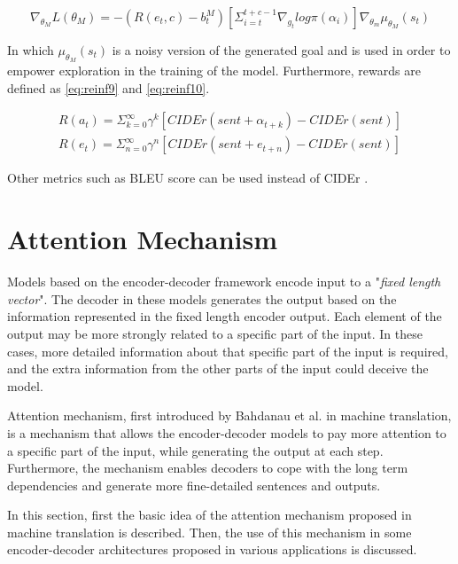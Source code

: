 \documentclass[preprint, 12pt]{elsarticle}
\begin{document}
		\begin{equation}
			\nabla_{\theta_M} L(\theta_M) = -(R(e_t, c) - b_t^M) [\Sigma_{i=t}^{t+c-1} \nabla_{g_t} log \pi(\alpha_i)] \nabla_{\theta_m} \mu_{\theta_M} (s_t)
			\label{eq:nabla}
		\end{equation}
		
		In which $\mu_{\theta_M} (s_t)$ is a noisy version of the generated goal and is used in order to empower exploration in the training of the model. Furthermore, rewards are defined as \eqref{eq:reinf9} and \eqref{eq:reinf10}.
		
		\begin{align}
			R(a_t) = \Sigma_{k=0}^\infty \gamma^k [CIDEr(sent + \alpha_{t+k}) - CIDEr(sent)] \label{eq:reinf9} \\
			R(e_t) = \Sigma_{n=0}^\infty \gamma^n [CIDEr(sent + e_{t+n}) - CIDEr(sent)] \label{eq:reinf10} 
		\end{align}
		
		Other metrics such as BLEU score can be used instead of CIDEr \cite{papineni2002bleu}.
		
	\section{Attention Mechanism}
		Models based on the encoder-decoder framework encode input to a "\textit{fixed length vector}". The decoder in these models generates the output based on the information represented in the fixed length encoder output. Each element of the output may be more strongly related to a specific part of the input. In these cases, more detailed information about that specific part of the input is required, and the extra information from the other parts of the input could deceive the model. 
		
		Attention mechanism, first introduced by Bahdanau et al. \cite{bahdanau2014neural} in machine translation, is a mechanism that allows the encoder-decoder models to pay more attention to a specific part of the input, while generating the output at each step. Furthermore, the mechanism enables decoders to cope with the long term dependencies and generate more fine-detailed sentences and outputs.
		
		In this section, first the basic idea of the attention mechanism proposed in machine translation is described. Then, the use of this mechanism in some encoder-decoder architectures proposed in various applications is discussed.
		
\end{document}
